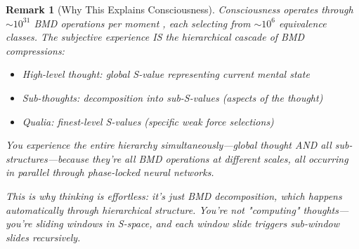 \documentclass[12pt,a4paper]{article}
\newtheorem{remark}[theorem]{Remark}
\begin{document}
\begin{remark}[Why This Explains Consciousness]
Consciousness operates through $\sim 10^{31}$ BMD operations per moment \cite{sachikonye2024consciousness}, each selecting from $\sim 10^6$ equivalence classes. The subjective experience IS the hierarchical cascade of BMD compressions:

\begin{itemize}
\item High-level thought: global S-value representing current mental state
\item Sub-thoughts: decomposition into sub-S-values (aspects of the thought)
\item Qualia: finest-level S-values (specific weak force selections)
\end{itemize}

You experience the entire hierarchy simultaneously—global thought AND all sub-structures—because they're all BMD operations at different scales, all occurring in parallel through phase-locked neural networks.

This is why thinking is effortless: it's just BMD decomposition, which happens automatically through hierarchical structure. You're not "computing" thoughts—you're sliding windows in S-space, and each window slide triggers sub-window slides recursively.
\end{remark}
\end{document}
